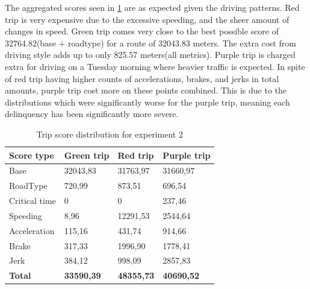 The aggregated scores seen in \ref{tab:longtripscores} are as expected given the driving patterns. Red trip is very expensive due to the excessive speeding, and the sheer amount of changes in speed. Green trip comes very close to the best possible score of 32764.82(base $+$ roadtype) for a route of 32043.83 meters. The extra cost from driving style adds up to only 825.57 meters(all metrics). Purple trip is charged extra for driving on a Tuesday morning where heavier traffic is expected. In spite of red trip having higher counts of accelerations, brakes, and jerks in total amounts, purple trip cost more on these points combined. This is due to the distributions which were significantly worse for the purple trip, meaning each delinquency has been significantly more severe.

\begin{table}
    \centering
    \begin{tabular}{llll}
    \textbf{Score type} & \textbf{Green trip} & \textbf{Red trip} & \textbf{Purple trip}\\ \hline
    Base                & 32043,83            & 31763,97          & 31660,97            \\
    RoadType            & 720,99              & 873,51            & 696,54              \\
    Critical time       & 0                   & 0                 & 237,46              \\
    Speeding            & 8,96                & 12291,53          & 2544,64             \\
    Acceleration        & 115,16              & 431,74            & 914,66              \\
    Brake               & 317,33              & 1996,90           & 1778,41             \\
    Jerk                & 384,12              & 998,09            & 2857,83             \\ \hline
    \textbf{Total}      & \textbf{33590,39}   & \textbf{48355,73} & \textbf{40690,52}   \\ \hline
    \end{tabular}
    \caption{Trip score distribution for experiment 2}
    \label{tab:longtripscores}
\end{table}

